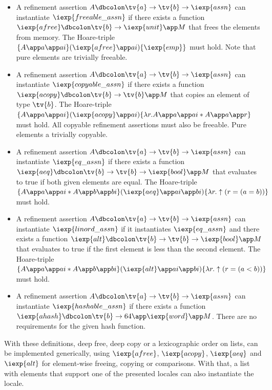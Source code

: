 \begin{itemize}
  \item A refinement assertion $A \dbcolon \tv{a} \rightarrow \tv{b} \rightarrow \iexp{assn}$ can instantiate $\iexp{freeable\_assn}$ if there exists a function $\iexp{afree} \dbcolon \tv{b} \rightarrow \iexp{unit} \app M$ that frees the elements from memory. The Hoare-triple $\{A \app a \app ai\}(\iexp{afree} \app ai)\{\iexp{emp}\}$ must hold. Note that pure elements are trivially freeable.
  \item A refinement assertion $A \dbcolon \tv{a} \rightarrow \tv{b} \rightarrow \iexp{assn}$ can instantiate $\iexp{copyable\_assn}$ if there exists a function $\iexp{acopy} \dbcolon \tv{b} \rightarrow \tv{b} \app M$ that copies an element of type $\tv{b}$.
    The Hoare-triple $\{A \app a \app ai\}(\iexp{acopy} \app ai)\{\lambda r. A \app a \app ai \ast A \app a \app r\}$ must hold.
    All copyable refinement assertions must also be freeable.
    Pure elements a trivially copyable.
  \item A refinement assertion $A \dbcolon \tv{a} \rightarrow \tv{b} \rightarrow \iexp{assn}$ can instantiate $\iexp{eq\_assn}$ if there exists a function $\iexp{aeq} \dbcolon \tv{b} \rightarrow \tv{b} \rightarrow \iexp{bool} \app M$ that evaluates to true if both given elements are equal.
    The Hoare-triple $\{A \app a \app ai \ast A \app b \app bi\}(\iexp{aeq} \app ai \app bi)\{\lambda r. \uparrow(r = (a=b))\}$ must hold.
  \item A refinement assertion $A \dbcolon \tv{a} \rightarrow \tv{b} \rightarrow \iexp{assn}$ can instantiate $\iexp{linord\_assn}$ if it instantiates $\iexp{eq\_assn}$ and there exists a function $\iexp{alt} \dbcolon \tv{b} \rightarrow \tv{b} \rightarrow \iexp{bool} \app M$ that evaluates to true if the first element is less than the second element.
    The Hoare-triple $\{A \app a \app ai \ast A \app b \app bi\}(\iexp{alt} \app ai \app bi)\{\lambda r. \uparrow(r = (a<b))\}$ must hold.
  \item A refinement assertion $A \dbcolon \tv{a} \rightarrow \tv{b} \rightarrow \iexp{assn}$ can instantiate $\iexp{hashable\_assn}$ if there exists a function $\iexp{ahash} \dbcolon \tv{b} \rightarrow 64 \app \iexp{word} \app M$.
    There are no requirements for the given hash function.
\end{itemize}

With these definitions, deep free, deep copy or a lexicographic order on lists, can be implemented generically, using $\iexp{afree}$, $\iexp{acopy}$, $\iexp{aeq}$ and $\iexp{alt}$ for element-wise freeing, copying or comparisons.
With that, a list with elements that support one of the presented locales can also instantiate the locale.

